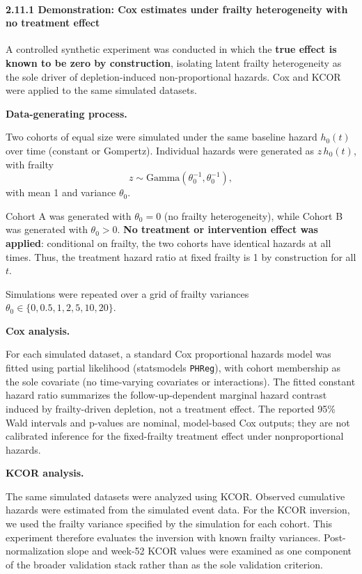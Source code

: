 \documentclass[
]{article}
\begin{document}
\paragraph{2.11.1 Demonstration: Cox estimates under frailty heterogeneity with no treatment effect}\label{demonstration-cox-estimates-under-frailty-heterogeneity-with-no-treatment-effect}

A controlled synthetic experiment was conducted in which the \textbf{true effect is known to be zero by construction}, isolating latent frailty heterogeneity as the sole driver of depletion-induced non-proportional hazards. Cox and KCOR were applied to the same simulated datasets.

\textbf{Data-generating process.}

Two cohorts of equal size were simulated under the same baseline hazard \(h_0(t)\) over time (constant or Gompertz). Individual hazards were generated as \(z\,h_0(t)\), with frailty \[z \sim \text{Gamma}(\theta_0^{-1}, \theta_0^{-1}),\] with mean 1 and variance \(\theta_0\).

Cohort A was generated with \(\theta_0 = 0\) (no frailty heterogeneity), while Cohort B was generated with \(\theta_0 > 0\). \textbf{No treatment or intervention effect was applied}: conditional on frailty, the two cohorts have identical hazards at all times. Thus, the treatment hazard ratio at fixed frailty is 1 by construction for all \(t\).

Simulations were repeated over a grid of frailty variances \(\theta_0 \in \{0, 0.5, 1, 2, 5, 10, 20\}\).

\textbf{Cox analysis.}

For each simulated dataset, a standard Cox proportional hazards model was fitted using partial likelihood (statsmodels \texttt{PHReg}), with cohort membership as the sole covariate (no time-varying covariates or interactions). The fitted constant hazard ratio summarizes the follow-up-dependent marginal hazard contrast induced by frailty-driven depletion, not a treatment effect. The reported 95\% Wald intervals and p-values are nominal, model-based Cox outputs; they are not calibrated inference for the fixed-frailty treatment effect under nonproportional hazards.

\textbf{KCOR analysis.}

The same simulated datasets were analyzed using KCOR. Observed cumulative hazards were estimated from the simulated event data. For the KCOR inversion, we used the frailty variance specified by the simulation for each cohort. This experiment therefore evaluates the inversion with known frailty variances. Post-normalization slope and week-52 KCOR values were examined as one component of the broader validation stack rather than as the sole validation criterion.
\end{document}
